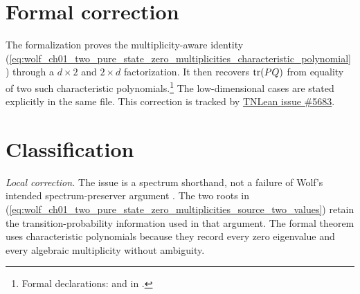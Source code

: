 \documentclass{article}
\begin{document}
\section{Formal correction}

The formalization proves the multiplicity-aware identity
(\ref{eq:wolf_ch01_two_pure_state_zero_multiplicities_characteristic_polynomial})
through a $d\times2$ and $2\times d$ factorization. It then recovers
$\operatorname{tr}(PQ)$ from equality of two such characteristic polynomials.\footnote{Formal
declarations:
 and
in .}
The low-dimensional cases are stated explicitly in the same file. This
correction is tracked by
\href{https://github.com/LionSR/TNLean/issues/5683}{TNLean issue \#5683}.

\section{Classification}

\emph{Local correction.} The issue is a spectrum shorthand, not a failure of
Wolf's intended spectrum-preserver argument \cite{Wolf2012Quantum}. The two
roots in
(\ref{eq:wolf_ch01_two_pure_state_zero_multiplicities_source_two_values})
retain the transition-probability information used in that argument. The
formal theorem uses characteristic polynomials because they record every zero
eigenvalue and every algebraic multiplicity without ambiguity.



\end{document}
